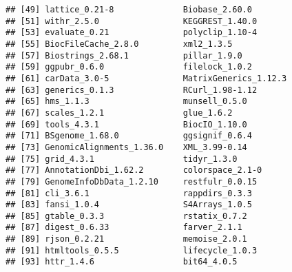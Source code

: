 \documentclass[
]{article}
\begin{document}
\begin{verbatim}
## [49] lattice_0.21-8              Biobase_2.60.0             
## [51] withr_2.5.0                 KEGGREST_1.40.0            
## [53] evaluate_0.21               polyclip_1.10-4            
## [55] BiocFileCache_2.8.0         xml2_1.3.5                 
## [57] Biostrings_2.68.1           pillar_1.9.0               
## [59] ggpubr_0.6.0                filelock_1.0.2             
## [61] carData_3.0-5               MatrixGenerics_1.12.3      
## [63] generics_0.1.3              RCurl_1.98-1.12            
## [65] hms_1.1.3                   munsell_0.5.0              
## [67] scales_1.2.1                glue_1.6.2                 
## [69] tools_4.3.1                 BiocIO_1.10.0              
## [71] BSgenome_1.68.0             ggsignif_0.6.4             
## [73] GenomicAlignments_1.36.0    XML_3.99-0.14              
## [75] grid_4.3.1                  tidyr_1.3.0                
## [77] AnnotationDbi_1.62.2        colorspace_2.1-0           
## [79] GenomeInfoDbData_1.2.10     restfulr_0.0.15            
## [81] cli_3.6.1                   rappdirs_0.3.3             
## [83] fansi_1.0.4                 S4Arrays_1.0.5             
## [85] gtable_0.3.3                rstatix_0.7.2              
## [87] digest_0.6.33               farver_2.1.1               
## [89] rjson_0.2.21                memoise_2.0.1              
## [91] htmltools_0.5.5             lifecycle_1.0.3            
## [93] httr_1.4.6                  bit64_4.0.5
\end{verbatim}
\end{document}
